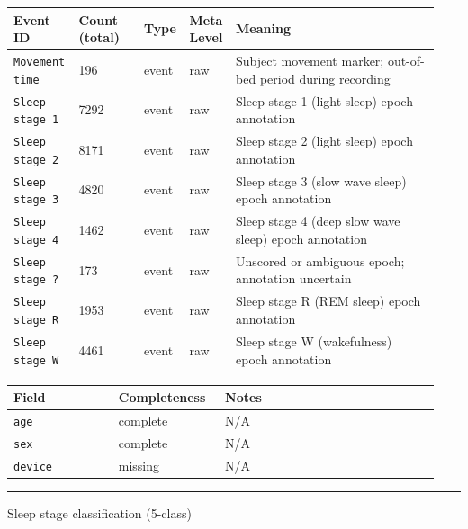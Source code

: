 {\begin{tcolorbox}
\begingroup\scriptsize\setlength{\tabcolsep}{2pt}
\begin{tabular}{@{}p{0.1567\linewidth}p{0.1567\linewidth}p{0.0783\linewidth}p{0.0783\linewidth}p{0.4700\linewidth}@{}}
\toprule
\textbf{Event ID} & \textbf{Count (total)} & \textbf{Type} & \textbf{Meta Level} & \textbf{Meaning} \\
\midrule
\texttt{Movement time} & 196 & event & raw & Subject movement marker; out-of-bed period during recording \\
\texttt{Sleep stage 1} & 7292 & event & raw & Sleep stage 1 (light sleep) epoch annotation \\
\texttt{Sleep stage 2} & 8171 & event & raw & Sleep stage 2 (light sleep) epoch annotation \\
\texttt{Sleep stage 3} & 4820 & event & raw & Sleep stage 3 (slow wave sleep) epoch annotation \\
\texttt{Sleep stage 4} & 1462 & event & raw & Sleep stage 4 (deep slow wave sleep) epoch annotation \\
\texttt{Sleep stage ?} & 173 & event & raw & Unscored or ambiguous epoch; annotation uncertain \\
\texttt{Sleep stage R} & 1953 & event & raw & Sleep stage R (REM sleep) epoch annotation \\
\texttt{Sleep stage W} & 4461 & event & raw & Sleep stage W (wakefulness) epoch annotation \\
\bottomrule
\end{tabular}
\endgroup
\smallskip{}\par\smallskip
\begingroup\scriptsize\setlength{\tabcolsep}{2pt}
\begin{tabular}{@{}p{0.2350\linewidth}p{0.2350\linewidth}p{0.4700\linewidth}@{}}
\toprule
\textbf{Field} & \textbf{Completeness} & \textbf{Notes} \\
\midrule
\texttt{age} & complete & N/A \\
\texttt{sex} & complete & N/A \\
\texttt{device} & missing & N/A \\
\bottomrule
\end{tabular}
\endgroup
\noindent\rule{\linewidth}{0.7pt}\par\nopagebreak
{}
 {\footnotesize Sleep stage classification (5-class)}\par\smallskip
{\footnotesize\begin{tabular}{@{}lp{0.62\linewidth}@{}}

\end{tabular}}
\end{tcolorbox}}
